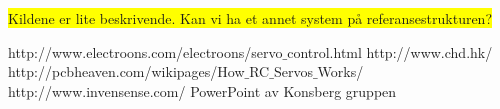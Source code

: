 \colorbox{yellow}{Kildene er lite beskrivende. Kan vi ha et annet system på referansestrukturen?}
\begin{thebibliography}{9}

 \label{ref:PWM} http://www.electroons.com/electroons/servo$\_$control.html
 \label{ref:PowerHD} http://www.chd.hk/
 \label{ref:SerCtrl} http://pcbheaven.com/wikipages/How$\_$RC$\_$Servos$\_$Works/
 \label{ref:InSens} http://www.invensense.com/
 \label{ref:PowerPoint} PowerPoint av Konsberg gruppen

\end{thebibliography}